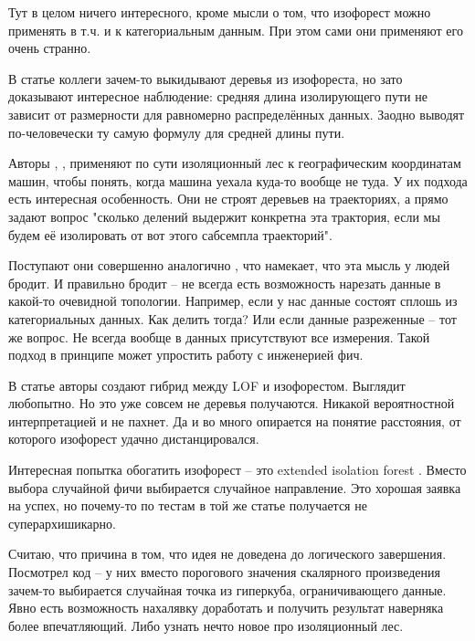 \documentclass[12pt]{article}
\begin{document}
Тут
\cite{sunDetectingAnomalousUser2016}
в целом ничего интересного, кроме мысли о том, что изофорест можно применять в т.ч.
и к категориальным данным. При этом сами они применяют его очень странно.

В статье
\cite{vinhDiscoveringOutlyingAspects2016}
коллеги зачем-то выкидывают деревья из изофореста, но зато доказывают интересное
наблюдение: средняя длина изолирующего пути не зависит от размерности для
равномерно распределённых данных. Заодно выводят по-человечески ту самую формулу
для средней длины пути.

Авторы
\cite{linDisorientationDetectionMining2015a},
\cite{zhangIBATDetectingAnomalous2011},
\cite{chenIBOATIsolationBasedOnline2013}
\cite{chenRealTimeDetectionAnomalous2012}
применяют по сути изоляционный лес к географическим координатам машин, чтобы понять,
когда машина уехала куда-то вообще не туда. У их подхода есть интересная особенность.
Они не строят деревьев на траекториях, а прямо задают вопрос "сколько делений выдержит
конкретна эта трактория, если мы будем её изолировать от вот этого сабсемпла
траекторий".

Поступают они совершенно аналогично
\cite{vinhDiscoveringOutlyingAspects2016}
, что намекает, что эта мысль у людей бродит. И правильно бродит -- не всегда есть
возможность нарезать данные в какой-то очевидной топологии. Например, если у нас
данные состоят сплошь из категориальных данных. Как делить тогда? Или если данные
разреженные -- тот же вопрос. Не всегда вообще в данных присутствуют все измерения.
Такой подход в принципе может упростить работу с инженерией фич.

В статье
\cite{bandaragodaEfficientAnomalyDetection2014a}
авторы создают гибрид между LOF и изофорестом. Выглядит любопытно. Но это уже
совсем не деревья получаются. Никакой вероятностной интерпретацией и не пахнет.
Да и во много опирается на понятие расстояния, от которого изофорест удачно
дистанцировался.

Интересная попытка обогатить изофорест -- это extended isolation forest
\cite{haririExtendedIsolationForest2021}
. Вместо выбора случайной фичи выбирается случайное направление. Это хорошая
заявка на успех, но почему-то по тестам в той же статье получается не
суперархишикарно.

Считаю, что причина в том, что идея не доведена до логического
завершения. Посмотрел код -- у них вместо порогового значения скалярного произведения
зачем-то выбирается случайная точка из гиперкуба, ограничивающего данные. Явно есть
возможность нахалявку доработать и получить результат наверняка более впечатляющий.
Либо узнать нечто новое про изоляционный лес.
\end{document}
